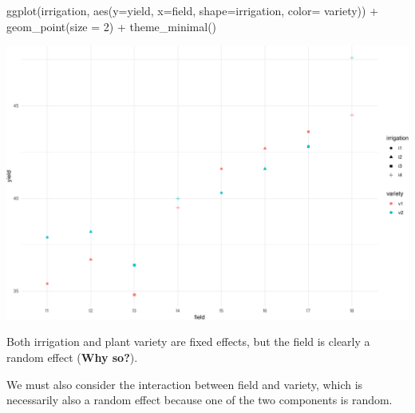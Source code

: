 \documentclass[
  ignorenonframetext,
]{beamer}
\newenvironment{Shaded}{\begin{snugshade}}{\end{snugshade}}
\newcommand{\AttributeTok}[1]{\textcolor[rgb]{0.77,0.63,0.00}{#1}}
\newcommand{\DecValTok}[1]{\textcolor[rgb]{0.00,0.00,0.81}{#1}}
\newcommand{\FunctionTok}[1]{\textcolor[rgb]{0.00,0.00,0.00}{#1}}
\newcommand{\NormalTok}[1]{#1}
\newcommand{\SpecialCharTok}[1]{\textcolor[rgb]{0.00,0.00,0.00}{#1}}
\begin{document}
\begin{frame}[fragile]{}
\protect\hypertarget{section}{}
\tiny

\begin{Shaded}
\begin{Highlighting}[]
\FunctionTok{ggplot}\NormalTok{(irrigation, }\FunctionTok{aes}\NormalTok{(}\AttributeTok{y=}\NormalTok{yield, }\AttributeTok{x=}\NormalTok{field, }\AttributeTok{shape=}\NormalTok{irrigation, }\AttributeTok{color=}\NormalTok{ variety)) }\SpecialCharTok{+} 
  \FunctionTok{geom\_point}\NormalTok{(}\AttributeTok{size =} \DecValTok{2}\NormalTok{) }\SpecialCharTok{+} 
  \FunctionTok{theme\_minimal}\NormalTok{()}
\end{Highlighting}
\end{Shaded}

\includegraphics{week11p2_files/figure-beamer/unnamed-chunk-2-1.pdf}
\end{frame}

\begin{frame}{}
\protect\hypertarget{section-1}{}
Both irrigation and plant variety are fixed effects, but the field is
clearly a random effect (\textbf{Why so?}).

We must also consider the interaction between field and variety, which
is necessarily also a random effect because one of the two components is
random.
\end{frame}
\end{document}
